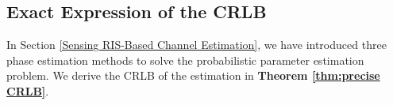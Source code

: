 \documentclass[conference,10pt,twocolumn]{IEEEtran}
\theoremstyle{nonumberplain}
\begin{document}
%
%
    
\subsection{Exact Expression of the CRLB} \label{Precise CRLB}
In Section \ref{Sensing RIS-Based Channel Estimation}, we have introduced three phase estimation methods to solve the probabilistic parameter estimation problem.
We derive the CRLB of the estimation in \textbf{Theorem \ref{thm:precise CRLB}}.
    
\end{document}
